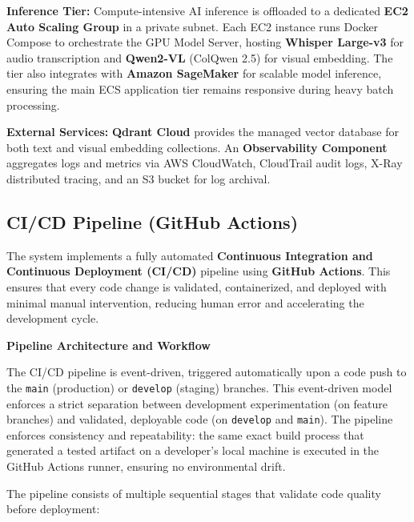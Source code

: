 \textbf{Inference Tier:} Compute-intensive AI inference is offloaded to a dedicated \textbf{EC2 Auto Scaling Group} in a private subnet. Each EC2 instance runs Docker Compose to orchestrate the GPU Model Server, hosting \textbf{Whisper Large-v3} for audio transcription and \textbf{Qwen2-VL} (ColQwen 2.5) for visual embedding. The tier also integrates with \textbf{Amazon SageMaker} for scalable model inference, ensuring the main ECS application tier remains responsive during heavy batch processing.

\textbf{External Services:} \textbf{Qdrant Cloud} provides the managed vector database for both text and visual embedding collections. An \textbf{Observability Component} aggregates logs and metrics via AWS CloudWatch, CloudTrail audit logs, X-Ray distributed tracing, and an S3 bucket for log archival.

\subsection{CI/CD Pipeline (GitHub Actions)}

The system implements a fully automated \textbf{Continuous Integration and Continuous Deployment (CI/CD)} pipeline using \textbf{GitHub Actions}. This ensures that every code change is validated, containerized, and deployed with minimal manual intervention, reducing human error and accelerating the development cycle.

\textbf{Pipeline Architecture and Workflow}

The CI/CD pipeline is event-driven, triggered automatically upon a code push to the \texttt{main} (production) or \texttt{develop} (staging) branches. This event-driven model enforces a strict separation between development experimentation (on feature branches) and validated, deployable code (on \texttt{develop} and \texttt{main}). The pipeline enforces consistency and repeatability: the same exact build process that generated a tested artifact on a developer's local machine is executed in the GitHub Actions runner, ensuring no environmental drift.

The pipeline consists of multiple sequential stages that validate code quality before deployment:

